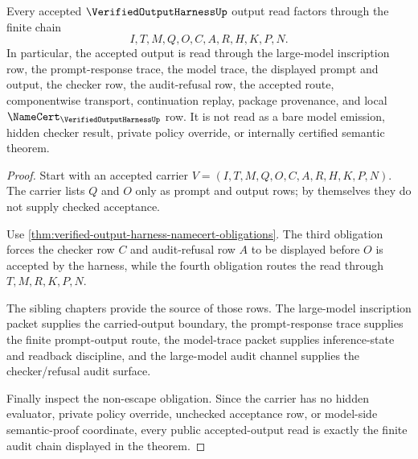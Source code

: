 \begin{theorem}
\label{thm:verified-output-harness-audit-chain}
Every accepted $\VerifiedOutputHarnessUp$ output read factors through the finite chain
$$
I,T,M,Q,O,C,A,R,H,K,P,N.
$$
In particular, the accepted output is read through the large-model inscription row, the prompt-response trace, the model trace, the displayed prompt and output, the checker row, the audit-refusal row, the accepted route, componentwise transport, continuation replay, package provenance, and local $\NameCert_{\VerifiedOutputHarnessUp}$ row. It is not read as a bare model emission, hidden checker result, private policy override, or internally certified semantic theorem.
\end{theorem}
\begin{proof}
Start with an accepted carrier $V=(I,T,M,Q,O,C,A,R,H,K,P,N)$. The carrier lists $Q$ and $O$ only as prompt and output rows; by themselves they do not supply checked acceptance.

Use \autoref{thm:verified-output-harness-namecert-obligations}. The third obligation forces the checker row $C$ and audit-refusal row $A$ to be displayed before $O$ is accepted by the harness, while the fourth obligation routes the read through $T,M,R,K,P,N$.

The sibling chapters provide the source of those rows. The large-model inscription packet supplies the carried-output boundary, the prompt-response trace supplies the finite prompt-output route, the model-trace packet supplies inference-state and readback discipline, and the large-model audit channel supplies the checker/refusal audit surface.

Finally inspect the non-escape obligation. Since the carrier has no hidden evaluator, private policy override, unchecked acceptance row, or model-side semantic-proof coordinate, every public accepted-output read is exactly the finite audit chain displayed in the theorem.
\end{proof}



